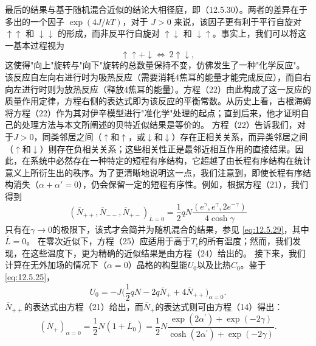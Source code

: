 最后的结果与基于随机混合近似的结论大相径庭，即（12.5.30）。两者的差异在于多出的一个因子 \(\exp(4J/kT)\)，对于 \(J>0\) 来说，该因子更有利于平行自旋对 \(\uparrow\uparrow\) 和 \(\downarrow\downarrow\) 的形成，而非反平行自旋对 \(\uparrow\downarrow\) 和 \(\downarrow\uparrow\)。事实上，我们可以将这一基本过程视为
\begin{equation}\tag{12.5.56}\label{eq:12.5.56}
\uparrow \uparrow + \downarrow \Leftrightarrow \ 2 \uparrow \downarrow ,
\end{equation}
这使得"向上"旋转与"向下"旋转的总数量保持不变，仿佛发生了一种"化学反应"。该反应自左向右进行时为吸热反应（需要消耗4焦耳的能量才能完成反应），而自右向左进行时则为放热反应（释放4焦耳的能量）。方程（22）由此构成了这一反应的质量作用定律，方程右侧的表达式即为该反应的平衡常数。从历史上看，古根海姆将方程（22）作为其对伊辛模型进行"准化学"处理的起点；直到后来，他才证明自己的处理方法与本文所阐述的贝特近似结果是等价的。
方程（22）告诉我们，对于\(J > 0\)，同类邻居之间（\(\uparrow\)和\(\uparrow\)，或\(\downarrow\)和\(\downarrow\)）存在正相关关系，而异类邻居之间（\(\uparrow\)和\(\downarrow\)）则存在负相关关系；这些相关性正是最邻近相互作用的直接结果。因此，在系统中必然存在一种特定的短程有序结构，它超越了由长程有序结构在统计意义上所衍生出的秩序。为了更清晰地说明这一点，我们注意到，即使长程有序结构消失（\(\alpha + \alpha' = 0\)），仍会保留一定的短程有序性。例如，根据方程（21），我们得到
\begin{equation}\tag{12.5.57}\label{eq:12.5.57}
\left( \overline { { N } } _ { + + } , \overline { { N } } _ { -- } , \overline { { N } } _ { + - } \right) _ { \overline { { L } } = 0 } = \frac { 1 } { 2 } q N \frac { \left( e ^{\gamma} , e ^{\gamma} , 2 e ^{- \gamma} \right) } { 4 \cosh \gamma }
\end{equation}
只有在\(\gamma \to 0\)的极限下，该式才会简并为随机混合的结果，参见 \autoref{eq:12.5.29}，其中\(\overline{L} = 0\)。
在零次近似下，方程（25）应适用于高于\(T_{c}\)的所有温度；然而，我们发现，在这些温度下，更为精确的近似结果是由方程（24）给出的。
接下来，我们计算在无外加场的情况下（\(\alpha=0\)）晶格的构型能\(U_0\)以及比热\(C_0\)。鉴于 \autoref{eq:12.5.25}，
\begin{equation}\tag{12.5.58}\label{eq:12.5.58}
U _ { 0 } = - J \biggl ( \frac { 1 } { 2 } q N - 2 q \overline { { N } } _ { + } + 4 \overline { { N } } _ { + + } \biggr ) _ { \alpha = 0 } .
\end{equation}
\(\overline{N}_{++}\)的表达式由方程（21）给出，而\(\overline{N}_{+}\)的表达式则可由方程（14）得出：
\begin{equation}\tag{12.5.59}\label{eq:12.5.59}
( \overline { { N } } _ { + } ) _ { \alpha = 0 } = \frac { 1 } { 2 } N ( 1 + \overline { { L } } _ { 0 } ) = \frac { 1 } { 2 } N \frac { \exp ( 2 \alpha ^{\prime} ) + \exp ( - 2 \gamma ) } { \cosh ( 2 \alpha ^{\prime} ) + \exp ( - 2 \gamma ) } .
\end{equation}
